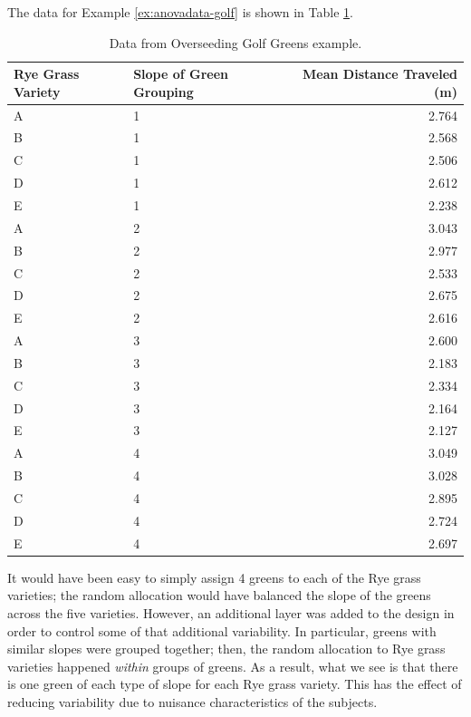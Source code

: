 \documentclass[]{book}
\theoremstyle{plain}
\theoremstyle{mydefn}
\theoremstyle{myexmpl}
\theoremstyle{remark}
\begin{document}
The data for Example \ref{ex:anovadata-golf} is shown in Table
\ref{tab:anovadata-golf-table}.

\begin{table}

\caption{\label{tab:anovadata-golf-table}Data from Overseeding Golf Greens example.}
\centering
\begin{tabular}[t]{l|l|r}
\hline
Rye Grass Variety & Slope of Green Grouping & Mean Distance Traveled (m)\\
\hline
A & 1 & 2.764\\
\hline
B & 1 & 2.568\\
\hline
C & 1 & 2.506\\
\hline
D & 1 & 2.612\\
\hline
E & 1 & 2.238\\
\hline
A & 2 & 3.043\\
\hline
B & 2 & 2.977\\
\hline
C & 2 & 2.533\\
\hline
D & 2 & 2.675\\
\hline
E & 2 & 2.616\\
\hline
A & 3 & 2.600\\
\hline
B & 3 & 2.183\\
\hline
C & 3 & 2.334\\
\hline
D & 3 & 2.164\\
\hline
E & 3 & 2.127\\
\hline
A & 4 & 3.049\\
\hline
B & 4 & 3.028\\
\hline
C & 4 & 2.895\\
\hline
D & 4 & 2.724\\
\hline
E & 4 & 2.697\\
\hline
\end{tabular}
\end{table}

It would have been easy to simply assign 4 greens to each of the Rye
grass varieties; the random allocation would have balanced the slope of
the greens across the five varieties. However, an additional layer was
added to the design in order to control some of that additional
variability. In particular, greens with similar slopes were grouped
together; then, the random allocation to Rye grass varieties happened
\emph{within} groups of greens. As a result, what we see is that there
is one green of each type of slope for each Rye grass variety. This has
the effect of reducing variability due to nuisance characteristics of
the subjects.
\end{document}
